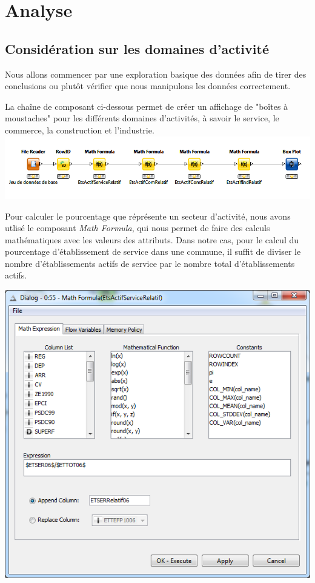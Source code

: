 \section{Analyse}

\subsection{Considération sur les domaines d'activité}

 Nous allons commencer par une exploration basique des données afin de tirer des conclusions ou plutôt vérifier que nous manipulons les données correctement.

La chaîne de composant ci-dessous permet de créer un affichage de "boîtes à moustaches" pour les différents domaines d'activités, à savoir le service, le commerce, la construction et l'industrie.
\includegraphics{png/BoxPlotDomainesActivité_knime.png}

Pour calculer le pourcentage que réprésente un secteur d'activité, nous avons utlisé le composant \textit{Math Formula}, qui nous permet de faire des calculs mathématiques avec les valeurs des attributs. Dans notre cas, pour le calcul du pourcentage d'établissement de service dans une commune, il suffit de diviser le nombre d'établissements actifs de service par le nombre total d'établissements actifs.

\includegraphics[width=15cm]{png/MathFormulaEtsActifServiceRelatif.png}

